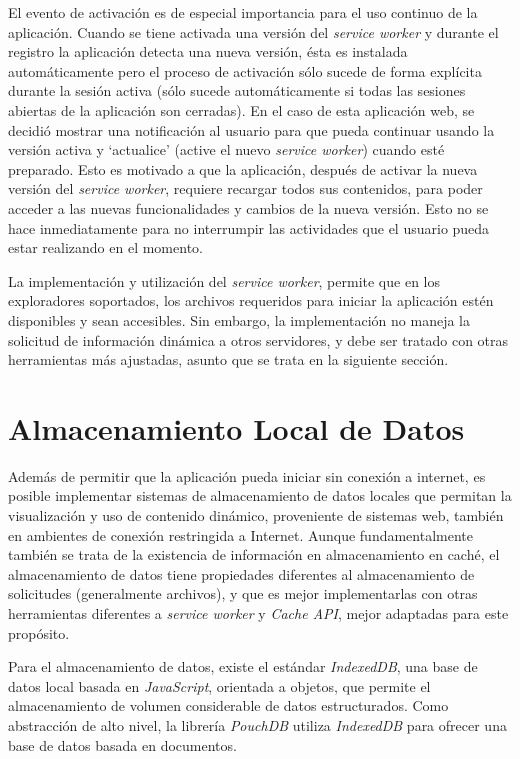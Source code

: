 El evento de activación es de especial importancia para el uso continuo de la aplicación. Cuando se tiene activada una versión del \textit{service worker} y durante el registro la aplicación detecta una nueva versión, ésta es instalada automáticamente pero el proceso de activación sólo sucede de forma explícita durante la sesión activa (sólo sucede automáticamente si todas las sesiones abiertas de la aplicación son cerradas). En el caso de esta aplicación web, se decidió mostrar una notificación al usuario para que pueda continuar usando la versión activa y ‘actualice’ (active el nuevo \textit{service worker}) cuando esté preparado. Esto es motivado a que la aplicación, después de activar la nueva versión del \textit{service worker}, requiere recargar todos sus contenidos, para poder acceder a las nuevas funcionalidades y cambios de la nueva versión. Esto no se hace inmediatamente para no interrumpir las actividades que el usuario pueda estar realizando en el momento.

La implementación y utilización del \textit{service worker}, permite que en los exploradores soportados, los archivos requeridos para iniciar la aplicación estén disponibles y sean accesibles. Sin embargo, la implementación no maneja la solicitud de información dinámica a otros servidores, y debe ser tratado con otras herramientas más ajustadas, asunto que se trata en la siguiente sección.

\section{Almacenamiento Local de Datos}

Además de permitir que la aplicación pueda iniciar sin conexión a internet, es posible implementar sistemas de almacenamiento de datos locales que permitan la visualización y uso de contenido dinámico, proveniente de sistemas web, también en ambientes de conexión restringida a Internet. Aunque fundamentalmente también se trata de la existencia de información en almacenamiento en caché, el almacenamiento de datos tiene propiedades diferentes al almacenamiento de solicitudes (generalmente archivos), y que es mejor implementarlas con otras herramientas diferentes a \textit{service worker} y \textit{Cache API}, mejor adaptadas para este propósito.

Para el almacenamiento de datos, existe el estándar \textit{IndexedDB}, una base de datos local basada en \textit{JavaScript}, orientada a objetos, que permite el almacenamiento de volumen considerable de datos estructurados. Como abstracción de alto nivel, la librería \textit{PouchDB} utiliza \textit{IndexedDB} para ofrecer una base de datos basada en documentos.

